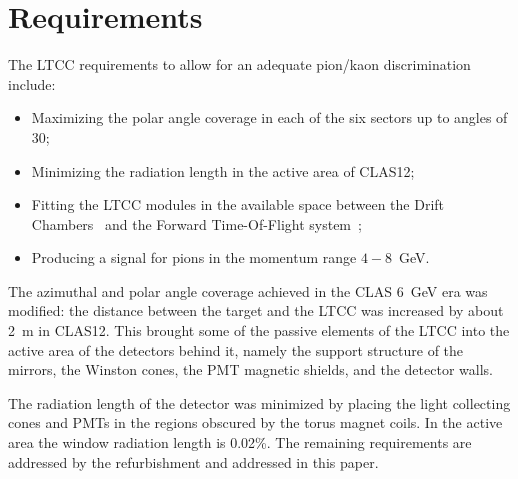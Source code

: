 \section{Requirements}

The LTCC requirements to allow for an adequate pion/kaon discrimination include:

\begin{itemize}
	\item Maximizing the polar angle coverage in each of the six sectors up to angles of 30\mdeg;
	\item Minimizing the radiation length in the active area of CLAS12;
	\item Fitting the LTCC modules in the available space between the Drift Chambers~\cite{dc-nim} and the Forward
          Time-Of-Flight system~\cite{ftof-nim};
	\item Producing a signal for pions in the momentum range $4-8$~GeV.
\end{itemize}

The azimuthal and polar angle coverage achieved in the CLAS 6~GeV era was modified: the
distance between the target and the LTCC was increased by about 2~m in CLAS12. This brought some of the passive
elements of the LTCC into the active area of the detectors behind it, namely the support structure of the mirrors, the
Winston cones, the PMT magnetic shields, and the detector walls.

The radiation length of the detector was minimized by placing the light collecting cones and PMTs in the regions
obscured by the torus magnet coils. In the active area the window radiation length is 0.02\%. The remaining
requirements are addressed by the refurbishment and addressed in this paper.

